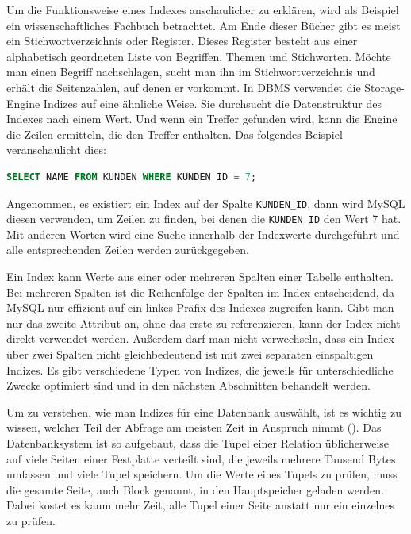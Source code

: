 Um die Funktionsweise eines Indexes anschaulicher zu erklären, wird als Beispiel ein wissenschaftliches Fachbuch betrachtet.
Am Ende dieser Bücher gibt es meist ein Stichwortverzeichnis oder Register.
Dieses Register besteht aus einer alphabetisch geordneten Liste von Begriffen, Themen und Stichworten.
Möchte man einen Begriff nachschlagen, sucht man ihn im Stichwortverzeichnis und erhält die Seitenzahlen, auf denen er vorkommt.
In DBMS verwendet die Storage-Engine Indizes auf eine ähnliche Weise.
Sie durchsucht die Datenstruktur des Indexes nach einem Wert.
Und wenn ein Treffer gefunden wird, kann die Engine die Zeilen ermitteln, die den Treffer enthalten.
Das folgendes Beispiel veranschaulicht dies:

\begin{lstlisting}[language=SQL]
SELECT NAME FROM KUNDEN WHERE KUNDEN_ID = 7;
\end{lstlisting}

Angenommen, es existiert ein Index auf der Spalte \texttt{KUNDEN\_ID}, dann wird MySQL diesen verwenden, um Zeilen zu finden, bei denen die \texttt{KUNDEN\_ID} den Wert 7 hat.
Mit anderen Worten wird eine Suche innerhalb der Indexwerte durchgeführt und alle entsprechenden Zeilen werden zurückgegeben.

Ein Index kann Werte aus einer oder mehreren Spalten einer Tabelle enthalten.
Bei mehreren Spalten ist die Reihenfolge der Spalten im Index entscheidend, da MySQL nur effizient auf ein linkes Präfix des Indexes zugreifen kann.
Gibt man nur das zweite Attribut an, ohne das erste zu referenzieren, kann der Index nicht direkt verwendet werden.
Außerdem darf man nicht verwechseln, dass ein Index über zwei Spalten nicht gleichbedeutend ist mit zwei separaten einspaltigen Indizes.
Es gibt verschiedene Typen von Indizes, die jeweils für unterschiedliche Zwecke optimiert sind und in den nächsten Abschnitten behandelt werden.

Um zu verstehen, wie man Indizes für eine Datenbank auswählt, ist es wichtig zu wissen, welcher Teil der Abfrage am meisten Zeit in Anspruch nimmt (\cite[S. 350--353]{garcia2008database}).
Das Datenbanksystem ist so aufgebaut, dass die Tupel einer Relation üblicherweise auf viele Seiten einer Festplatte verteilt sind, die jeweils mehrere Tausend Bytes umfassen und viele Tupel speichern.
Um die Werte eines Tupels zu prüfen, muss die gesamte Seite, auch Block genannt, in den Hauptspeicher geladen werden.
Dabei kostet es kaum mehr Zeit, alle Tupel einer Seite anstatt nur ein einzelnes zu prüfen.

